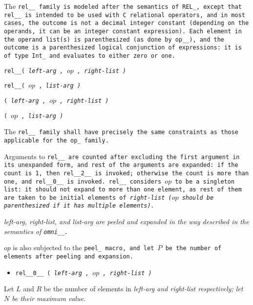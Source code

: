 The \tt{rel__} family is modeled after the semantics of \tt{REL_},
except that \tt{rel__} is intended to be used with C relational operators,
and in most cases, the outcome is not a decimal integer constant
(depending on the operands, it can be an integer constant expression).
Each element in the operand list(s) is parenthesized (as done by \tt{op__}),
and the outcome is a parenthesized logical conjunction of expressions:
it is of type \tt{Int_} and evaluates to either zero or one.

\pagebreak


 \tt{rel__}\s\s\s\s\tt{(} \it{left-arg} \tt{,} $op$ \tt{,} \it{right-list} \tt{)}

 \tt{rel__}\s\s\s\s\tt{(} $op$ \tt{,} \it{list-arg} \tt{)}

\s\tt{(} \it{left-arg} \tt{,} $op$ \tt{,} \it{right-list} \tt{)}

\s\tt{(} $op$ \tt{,} \it{list-arg} \tt{)}


The \tt{rel__} family shall have precisely the same
constraints as those applicable for the \tt{op_} family.


Arguments to \tt{rel__} are counted after excluding the first
argument in its unexpanded form, and rest of the arguments
are expanded: if the count is 1, then \tt{rel__2__} is invoked;
otherwise the count is more than one, and  \tt{rel__0__} is invoked.
\tt{rel__} considers $op$ to be a singleton list: it should not expand to
more than one element, as rest of them are taken to be initial elements of
\it{right-list} ($op$ should be parenthesized if it has multiple elements).

\it{left-arg}, \it{right-list}, and \it{list-arg} are peeled and
expanded in the way described in the semantics of \tt{omni__}.

$op$ is also subjected to the \tt{peel_} macro, and let
$P$ be the number of elements after peeling and expansion.

\begin{itemize}
\item \tt{rel__0__ (} \it{left-arg} \tt{,} $op$ \tt{,} \it{right-list} \tt{)}
\end{itemize}

Let $L$ and $R$ be the number of elements in \it{left-arg} and
\it{right-list} respectively; let $N$ be their maximum value.

